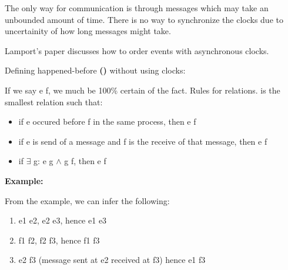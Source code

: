 \documentclass[twoside]{article}
\begin{document}
The only way for communication is through messages which may take an unbounded amount of time.
There is no way to synchronize the clocks due to uncertainity of how long messages might take.

Lamport's paper discusses how to order events with asynchronous clocks.

Defining happened-before \textbf{(\textrightarrow)} without using clocks:

If we say e \textbf{\textrightarrow} f, we much be 100\% certain of the fact.
Rules for \textbf{\textrightarrow} relations.  \textbf{\textrightarrow} is the smallest relation such that:
\begin{itemize}
	\item if e occured before f in the same process, then e \textbf{\textrightarrow} f
	\item if e is send of a message and f is the receive of that message, then e  \textbf{\textrightarrow} f
	\item if $\exists$ g: e  \textbf{\textrightarrow} g $\land$ g  \textbf{\textrightarrow} f, then e  \textbf{\textrightarrow} f
\end{itemize}

\textbf{Example:}



From the example, we can infer the following:
\begin{enumerate}
  \item  e1 \textbf{\textrightarrow} e2,  e2 \textbf{\textrightarrow} e3, hence  e1 \textbf{\textrightarrow} e3
  \item  f1 \textbf{\textrightarrow} f2, f2 \textbf{\textrightarrow} f3, hence f1 \textbf{\textrightarrow} f3
  \item  e2 \textbf{\textrightarrow} f3 (message sent at e2 received at f3) hence e1 \textbf{\textrightarrow} f3
\end{enumerate}
\end{document}

